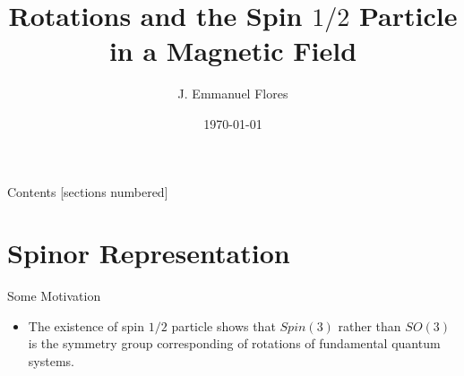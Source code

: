 \documentclass[12pt]{beamer}
\title{Rotations and the Spin $1/2$ Particle in a Magnetic Field}
\date{\today}
\author{J. Emmanuel Flores}
\institute{Advanced Mathematical Methods, Tufts University}
\begin{document}
\maketitle

\begin{frame}{Contents}
	[sections numbered]
\tableofcontents

\end{frame}

\section[Spinor Representation]{Spinor Representation}

\begin{frame}[fragile]{Some Motivation}
	\begin{itemize}
	\item The existence of spin $1/2$ particle shows that $Spin(3)$ rather than $SO(3)$ is the symmetry group corresponding of rotations of fundamental quantum systems.
	\end{itemize}
\end{frame}
\end{document}
